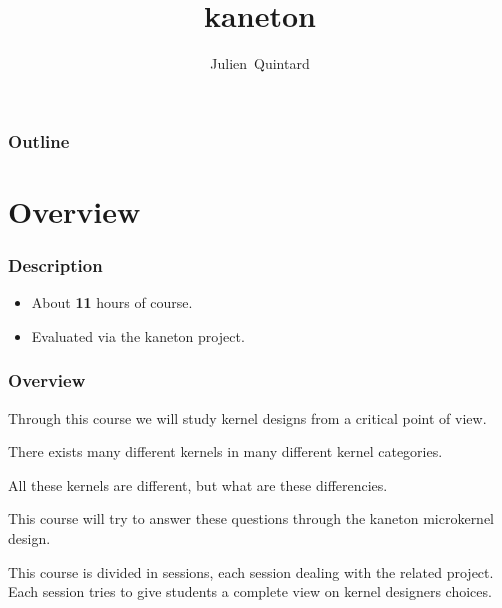 
%
%



%
%

\title{kaneton}

%
%

\author
{
  Julien~Quintard
}

%
%



%
%

\begin{frame}
  \titlepage

  \begin{center}
    \logos
  \end{center}
\end{frame}

%
%

\begin{frame}
  \frametitle{Outline}
  \tableofcontents
\end{frame}

%
%

\section{Overview}


\begin{frame}
  \frametitle{Description}

  \begin{itemize}
    \item
      About \textbf{11} hours of course.
    \item
      Evaluated via the kaneton project.
  \end{itemize}
\end{frame}


\begin{frame}
  \frametitle{Overview}

  Through this course we will study kernel designs from a critical
  point of view.

  \nl

  There exists many different kernels in many different kernel categories.

  \nl

  All these kernels are different, but what are these differencies.

  \nl

  This course will try to answer these questions through the
  kaneton microkernel design.

  \nl

  This course is divided in sessions, each session dealing with the
  related project. Each session tries to give students a complete view
  on kernel designers choices.
\end{frame}


